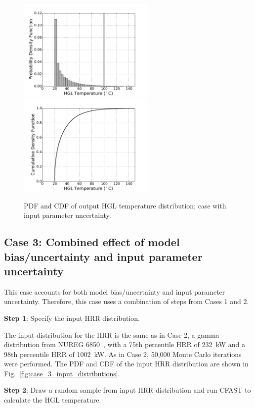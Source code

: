 \documentclass[12pt]{article}
\begin{document}
\begin{figure}[p]
\includegraphics[width=2.6in]{Figures/output_PDF_2_input}
\includegraphics[width=2.6in]{Figures/output_CDF_2_input}
\caption{PDF and CDF of output HGL temperature distribution; case with input parameter uncertainty.}
\label{fig:case_2_output_distributions}
\end{figure}


\clearpage


\subsection{Case 3: Combined effect of model bias/uncertainty and input parameter uncertainty}

This case accounts for both model bias/uncertainty and input parameter uncertainty. Therefore, this case uses a combination of steps from Cases 1 and 2.

\textbf{Step 1}: Specify the input HRR distribution.

The input distribution for the HRR is the same as in Case 2, a gamma distribution from NUREG 6850~\cite{NUREG_6850}, with a 75th percentile HRR of 232~kW and a 98th percentile HRR of 1002~kW. As in Case 2, 50,000 Monte Carlo iterations were performed. The PDF and CDF of the input HRR distribution are shown in Fig.~\ref{fig:case_3_input_distributions}.

\textbf{Step 2}: Draw a random sample from input HRR distribution and run CFAST to calculate the HGL temperature.
\end{document}
